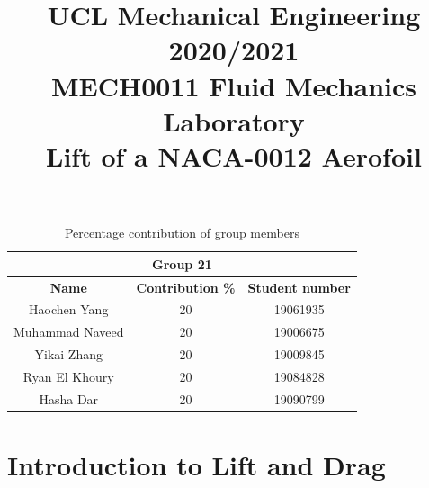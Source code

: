 \documentclass[11pt]{article}
\begin{document}
\title{\textbf{UCL Mechanical Engineering 2020/2021}\\MECH0011 Fluid Mechanics Laboratory\\
Lift of a NACA-0012 Aerofoil}
\maketitle
\begin{table}[H]
  \caption{Percentage contribution of group members}
  \begin{center}
  \begin{tabular}{||c|c|c||}
      \hline
      \multicolumn{3}{||c||}{\textbf{Group 21}}\\
      \hline
      \textbf{Name} & \textbf{Contribution \%} & \textbf{Student number}\\
      \hline
      \hline
      Haochen Yang & 20 & 19061935\\
      Muhammad Naveed & 20 & 19006675\\
      Yikai Zhang & 20 & 19009845\\
      Ryan El Khoury & 20 & 19084828\\
      Hasha Dar & 20 & 19090799\\
      \hline
  \end{tabular}
  \end{center}
\end{table}
\section*{Introduction to Lift and Drag}
\end{document}
